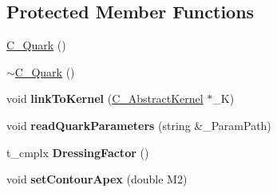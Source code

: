 \subsection*{Protected Member Functions}
\begin{DoxyCompactItemize}
\item 
\hyperlink{class_c___quark_a7ceb205746e82ecf1c792ec9f11c037a}{C\-\_\-\-Quark} ()
\item 
\hyperlink{class_c___quark_a49f6931861a7144c7215abdbcfba0b7d}{$\sim$\-C\-\_\-\-Quark} ()
\item 
\hypertarget{class_c___quark_aea358bb9c82c6e62d99c69893cc35cf9}{void {\bfseries link\-To\-Kernel} (\hyperlink{class_c___abstract_kernel}{C\-\_\-\-Abstract\-Kernel} $\ast$\-\_\-\-K)}\label{class_c___quark_aea358bb9c82c6e62d99c69893cc35cf9}

\item 
\hypertarget{class_c___quark_a8705085256b1afed49a029e7566be3a6}{void {\bfseries read\-Quark\-Parameters} (string \&\-\_\-\-Param\-Path)}\label{class_c___quark_a8705085256b1afed49a029e7566be3a6}

\item 
\hypertarget{class_c___quark_a08c1d6a09388082de04c981e8106caa1}{t\-\_\-cmplx {\bfseries Dressing\-Factor} ()}\label{class_c___quark_a08c1d6a09388082de04c981e8106caa1}

\item 
\hypertarget{class_c___quark_a1065f0f828e3d7766c8c04f83277d77b}{void {\bfseries set\-Contour\-Apex} (double M2)}\label{class_c___quark_a1065f0f828e3d7766c8c04f83277d77b}


\end{DoxyCompactItemize}
